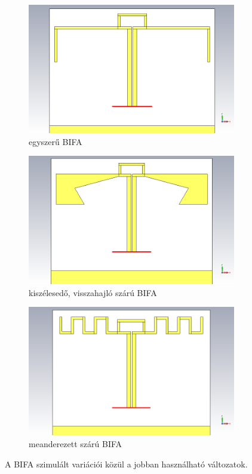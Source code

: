 \begin{figure}[h]
	\centering
	\begin{subfigure}[b]{0.48\textwidth}
		\centering
		\includegraphics[width=\textwidth]{kep/results/bifa_3D.png}
		\caption{egyszerű BIFA}
		\label{subfig:bifa}
	\end{subfigure}
	\hfill
	\begin{subfigure}[b]{0.48\textwidth}
		\centering
		\includegraphics[width=\textwidth]{kep/results/bifa_broadband_3D.png}
		\caption{kiszélesedő, visszahajló szárú BIFA}
	\end{subfigure}
	\hfill
	\begin{subfigure}[b]{0.48\textwidth}
		\centering
		\includegraphics[width=\textwidth]{kep/results/bifa_meandered_3D.png}
		\caption{meanderezett szárú BIFA}
	\end{subfigure}
	\caption{A BIFA szimulált variációi közül a jobban használható változatok.}
	\label{fig:bifa-variaciok}
\end{figure}
